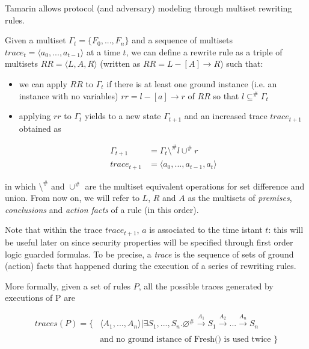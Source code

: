 Tamarin allows protocol (and adversary) modeling through multiset rewriting rules.

\begin{definition}

Given a multiset $\Gamma_t = \{ F_0, ..., F_n \}$ and a sequence of multisets $trace_t = \langle a_0, ..., a_{t-1} \rangle$ at a time $t$, we can define a rewrite rule as a triple of multisets $RR = \langle L, A, R \rangle$ (written as $RR= L -[ A ] \rightarrow R$) such that:

\begin{itemize}
    \item we can apply $RR$ to $\Gamma_t$ if there is at least one ground instance (i.e. an instance with no variables) $rr = l -[ a ] \rightarrow r$ of $RR$ so that $l \subseteq^{\#} \Gamma_t$
    \item applying $rr$ to $\Gamma_t$ yields to a new state $\Gamma_{t+1}$ and an increased trace $trace_{t+1}$ obtained as

\begin{align}
    \Gamma_{t+1} &= \Gamma_t \setminus^{\#} l \cup^{\#} r \label{eq:StateEvolution}\\
    trace_{t+1} &= \langle a_0, ..., a_{t-1}, a_t \rangle
\end{align}

\end{itemize}

in which $\setminus^{\#}$ and $\cup^{\#}$ are the multiset equivalent operations for set difference and union. From now on, we will refer to $L$, $R$ and $A$ as the multisets of \textit{premises}, \textit{conclusions} and \textit{action facts} of a rule (in this order). 
\end{definition}

Note that within the trace $trace_{t+1}$, $a$ is associated to the time istant $t$: this will be useful later on since security properties will be specified through first order logic guarded formulas. To be precise, a \textit{trace} is the sequence of sets of ground (action) facts that happened during the execution of a series of rewriting rules.

More formally, given a set of rules $P$, all the possible traces generated by executions of P are

\begin{align*}
    traces(P) = \{ &\langle A_1,...,A_n \rangle | \exists S_1,...,S_n . \varnothing ^{\#} \xrightarrow[]{A_1} S_1 \xrightarrow[]{A_2} ... \xrightarrow[]{A_n} S_n\\
    & \textrm{and no ground istance of Fresh() is used twice }\}
\end{align*}

